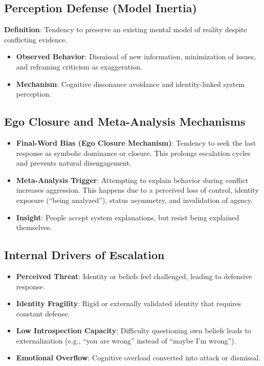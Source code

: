 \documentclass[11pt,a4paper]{article}
\begin{document}
\subsection{Perception Defense (Model Inertia)}
\textbf{Definition}: Tendency to preserve an existing mental model of reality despite conflicting evidence.
\begin{itemize}
    \item \textbf{Observed Behavior}: Dismissal of new information, minimization of issues, and reframing criticism as exaggeration.
    \item \textbf{Mechanism}: Cognitive dissonance avoidance and identity-linked system perception.
\end{itemize}

\subsection{Ego Closure and Meta-Analysis Mechanisms}
\begin{itemize}
    \item \textbf{Final-Word Bias (Ego Closure Mechanism)}: Tendency to seek the last response as symbolic dominance or closure. This prolongs escalation cycles and prevents natural disengagement.
    \item \textbf{Meta-Analysis Trigger}: Attempting to explain behavior during conflict increases aggression. This happens due to a perceived loss of control, identity exposure (“being analyzed”), status asymmetry, and invalidation of agency. 
    \item \textbf{Insight}: People accept system explanations, but resist being explained themselves.
\end{itemize}

\subsection{Internal Drivers of Escalation}
\begin{itemize}
    \item \textbf{Perceived Threat}: Identity or beliefs feel challenged, leading to defensive response.
    \item \textbf{Identity Fragility}: Rigid or externally validated identity that requires constant defense.
    \item \textbf{Low Introspection Capacity}: Difficulty questioning own beliefs leads to externalization (e.g., “you are wrong” instead of “maybe I’m wrong”).
    \item \textbf{Emotional Overflow}: Cognitive overload converted into attack or dismissal.
\end{itemize}
\end{document}
